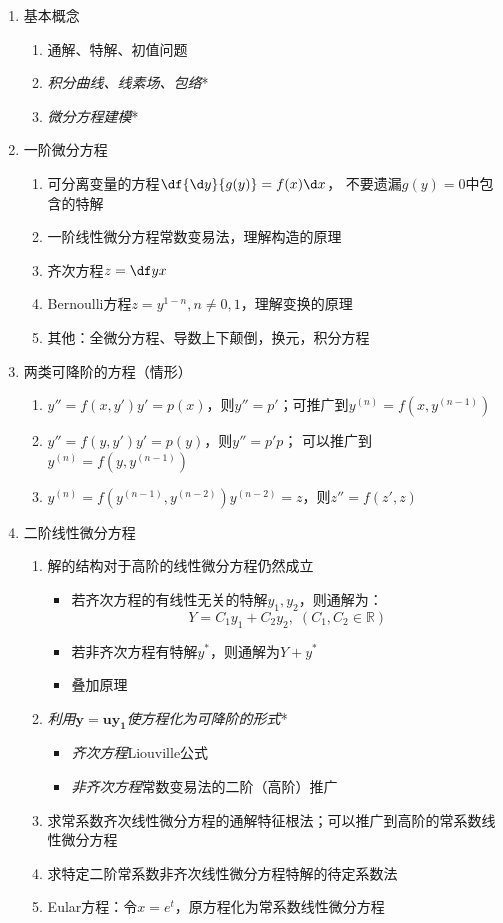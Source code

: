 \begin{enumerate}[1.]
  \item 基本概念
  \begin{enumerate}[(1)]
    \item 通解、特解、初值问题
    \item {\it 积分曲线、线素场、包络}*
    \item {\it 微分方程建模}*
  \end{enumerate}
  \item 一阶微分方程
  \begin{enumerate}[(1)]
    \item 可分离变量的方程\dotfill$\df{\d y}{g(y)}=f(x)\d x$，
    不要遗漏$g(y)=0$中包含的特解
    \item 一阶线性微分方程\dotfill 常数变易法，理解构造的原理
    \item 齐次方程\dotfill$z=\df yx$
    \item Bernoulli方程\dotfill$z=y^{1-n},n\ne0,1$，理解变换的原理
    \item 其他：全微分方程、导数上下颠倒，换元，积分方程
  \end{enumerate}
  \item 两类可降阶的方程（情形）
  \begin{enumerate}[(1)]
    \item $y''=f(x,y')$$y'=p(x)$，则$y''=p'$；可推广到$y^{(n)}=f(x,y^{(n-1)})$
    \item $y''=f(y,y')$\dotfill$y'=p(y)$，则$y''=p'p$；
    可以推广到$y^{(n)}=f(y,y^{(n-1)})$
    \item $y^{(n)}=f(y^{(n-1)},y^{(n-2)})$\dotfill$y^{(n-2)}=z$，则$z''=f(z',z)$
  \end{enumerate}
  \item 二阶线性微分方程
  \begin{enumerate}[(1)]
    \item 解的结构\dotfill 对于高阶的线性微分方程仍然成立
    \begin{itemize}
      \item 若齐次方程的有线性无关的特解$y_1,y_2$，则通解为：
      $$Y=C_1y_1+C_2y_2,\;(C_1,C_2\in\mathbb{R})$$
      \item 若非齐次方程有特解$y^*$，则通解为$Y+y^*$
      \item 叠加原理
    \end{itemize}
    \item {\it 利用$\bm{y=uy_1}$使方程化为可降阶的形式}*
    \begin{itemize}
      \item {\it 齐次方程}\dotfill Liouville公式
      \item {\it 非齐次方程}\dotfill 常数变易法的二阶（高阶）推广
    \end{itemize}
    \item 求常系数齐次线性微分方程的通解\dotfill 特征根法；可以推广到高阶的常系数线性微分方程
    \item 求特定二阶常系数非齐次线性微分方程特解的待定系数法
    \item Eular方程：\dotfill 令$x=e^t$，原方程化为常系数线性微分方程
  \end{enumerate}
\end{enumerate}


